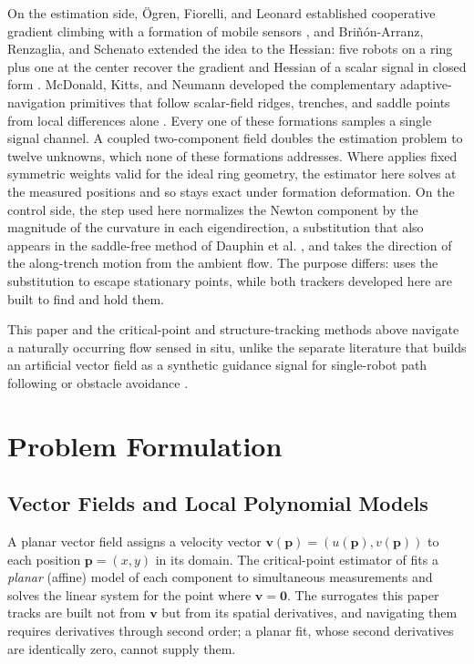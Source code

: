 \documentclass[lettersize,journal]{IEEEtran}
\begin{document}
On the estimation side, \"{O}gren, Fiorelli, and Leonard established
cooperative gradient climbing with a formation of mobile sensors
\cite{26}, and Bri\~{n}\'{o}n-Arranz, Renzaglia, and Schenato extended
the idea to the Hessian: five robots on a ring plus one at the center
recover the gradient and Hessian of a scalar signal in closed form
\cite{15}. McDonald, Kitts, and Neumann developed the complementary
adaptive-navigation primitives that follow scalar-field ridges,
trenches, and saddle points from local differences alone
\cite{27,28,29}. Every one of these formations samples a single signal
channel. A coupled two-component field doubles the estimation problem
to twelve unknowns, which none of these formations addresses. Where
\cite{15} applies fixed symmetric weights valid
for the ideal ring geometry, the estimator here solves at the measured
positions and so stays exact under formation deformation. On the
control side, the step used here normalizes the Newton component by the
magnitude of the curvature in each eigendirection, a substitution that
also appears in the saddle-free method of Dauphin et al. \cite{35},
and takes the direction of the along-trench motion from the ambient
flow. The purpose differs: \cite{35} uses the substitution to escape
stationary points, while both trackers developed here are built to
find and hold them.

This paper and the critical-point and structure-tracking methods above
\cite{9,10,11,12,13,14} navigate a naturally occurring flow sensed in
situ, unlike the separate literature that builds an artificial vector
field as a synthetic guidance signal for single-robot path following
\cite{37} or obstacle avoidance \cite{38}.

\section{Problem Formulation}
\label{sec:detj_field}

\subsection{Vector Fields and Local Polynomial Models}

A planar vector field assigns a velocity vector $\mathbf{v}(\mathbf{p}) =
(u(\mathbf{p}), v(\mathbf{p}))$ to each position $\mathbf{p} = (x, y)$ in its
domain. The critical-point estimator of \cite{14} fits a \emph{planar}
(affine) model of each component to simultaneous measurements and solves
the linear system for the point where $\mathbf{v} = \mathbf{0}$. The
surrogates this paper tracks are built not from $\mathbf{v}$ but from its
spatial derivatives, and navigating them requires derivatives through
second order; a planar fit, whose second derivatives are identically zero,
cannot supply them.
\end{document}
